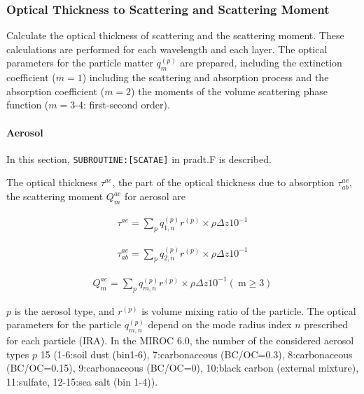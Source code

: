 \hypertarget{optical-thickness-to-scattering-and-scattering-moment}{%
\subsubsection{Optical Thickness to Scattering and Scattering Moment}\label{optical-thickness-to-scattering-and-scattering-moment}}

Calculate the optical thickness of scattering and the scattering moment. These calculations are performed for each wavelength and each layer. The optical parameters for the particle matter
\(q_{m}^{(p)}\) are prepared, including the extinction coefficient (\(m = 1\)) including the scattering and absorption process and the absorption coefficient (\(m = 2\)) the moments of the volume
scattering phase function (\(m=3\text{-}4\): first-second order).

\hypertarget{aerosol}{%
\paragraph{Aerosol}\label{aerosol}}

In this section, \texttt{SUBROUTINE:{[}SCATAE{]}} in pradt.F is described.

The optical thickness \(\tau^{a e}\), the part of the optical thickness due to absorption \(\tau_{ab}^{a e}\), the scattering moment \(Q_{m}^{a e}\) for aerosol are

\begin{eqnarray}
\tau^{a e}=\sum_{p} q_{1, n}^{(p)} r^{(p)} \times \rho \Delta z 10^{-1}
\end{eqnarray}

\begin{eqnarray}
\tau_{ab}^{a e}=\sum_{p} q_{2, n}^{(p)} r^{(p)} \times \rho \Delta z 10^{-1}
\end{eqnarray}

\begin{eqnarray}
Q_{m}^{a e}=\sum_{p} q_{m, n}^{(p)} r^{(p)} \times \rho \Delta z 10^{-1} (\mathrm{~m} \geq 3)
\end{eqnarray}

\(p\) is the aerosol type, and \(r^{(p)}\) is volume mixing ratio of the particle. The optical parameters for the particle \(q_{m, n}^{(p)}\) depend on the mode radius index \(n\) prescribed for each
particle (IRA). In the MIROC 6.0, the number of the considered aerosol types \(p\) 15 (1-6:soil dust (bin1-6), 7:carbonaceous (BC/OC=0.3), 8:carbonaceous (BC/OC=0.15), 9:carbonaceous (BC/OC=0),
10:black carbon (external mixture), 11:sulfate, 12-15:sea salt (bin 1-4)).

